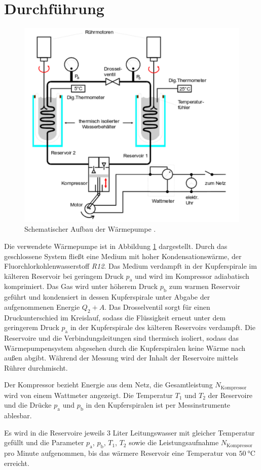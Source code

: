 \section{Durchführung}
\label{sec:Durchfuehrung}
\begin{figure}
	\includegraphics[width=\textwidth]{Bilder/Abbildung.pdf}
	\caption{Schematischer Aufbau der Wärmepumpe \cite{V206} \cite{gimp}.}
	\label{fig:pumpe}
\end{figure}
Die verwendete Wärmepumpe ist in Abbildung \ref{fig:pumpe} dargestellt.
Durch das geschlossene System fließt eine Medium mit hoher Kondensationswärme, der Fluorchlorkohlenwasserstoff \textit{R12}.
Das Medium verdampft in der Kupferspirale im kälteren Reservoir bei geringem Druck $p_\text{a}$ und wird im Kompressor adiabatisch komprimiert. 
Das Gas wird unter höherem Druck $p_\text{b}$ zum warmen Reservoir geführt und kondensiert in dessen Kupferspirale unter Abgabe der aufgenommenen Energie $Q_2+A$.
Das Drosselventil sorgt für einen Druckunterschied im Kreislauf, sodass die Flüssigkeit erneut unter dem geringerem Druck $p_\text{a}$ in der Kupferspirale des kälteren Reservoirs verdampft. 
Die Reservoire und die Verbindungsleitungen sind thermisch isoliert, sodass das Wärmepumpensystem abgesehen durch die Kupferspiralen keine Wärme nach außen abgibt.
Während der Messung wird der Inhalt der Reservoire mittels Rührer durchmischt.

Der Kompressor bezieht Energie aus dem Netz, die Gesamtleistung $N_\text{Kompressor}$ wird von einem Wattmeter angezeigt. 
Die Temperatur $T_1$ und $T_2$ der Reservoire und die Drücke $p_\text{a}$ und $p_\text{b}$ in den Kupferspiralen ist per Messinstrumente ablesbar.

Es wird in die Reservoire jeweils 3 Liter Leitungswasser mit gleicher Temperatur gefüllt und die Parameter $p_\text{a}$, $p_\text{b}$, $T_1$, $T_2$ sowie die Leistungsaufnahme $N_\text{Kompressor}$ pro Minute aufgenommen, bis das wärmere Reservoir eine Temperatur von $\SI{50}{\degreeCelsius}$ erreicht.
